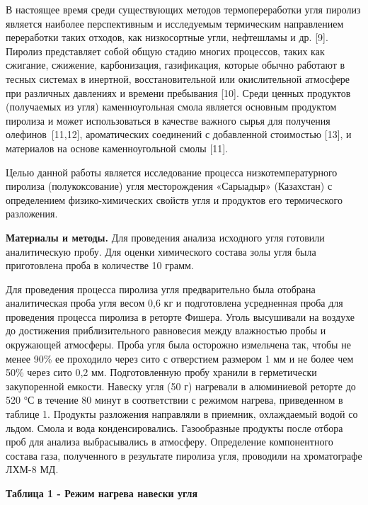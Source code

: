 В настоящее время среди существующих методов термопереработки угля
пиролиз является наиболее перспективным и исследуемым термическим
направлением переработки таких отходов, как низкосортные угли,
нефтешламы и др. {[}9{]}. Пиролиз представляет собой общую стадию многих
процессов, таких как сжигание, сжижение, карбонизация, газификация,
которые обычно работают в тесных системах в инертной, восстановительной
или окислительной атмосфере при различных давлениях и времени пребывания
{[}10{]}. Среди ценных продуктов (получаемых из угля) каменноугольная
смола является основным продуктом пиролиза и может использоваться в
качестве важного сырья для получения олефинов~{[}11,12{]}, ароматических
соединений с добавленной стоимостью {[}13{]}, и материалов на основе
каменноугольной смолы {[}11{]}.~

Целью данной работы является исследование процесса низкотемпературного
пиролиза (полукоксование) угля месторождения «Сарыадыр» (Казахстан) с
определением физико-химических свойств угля и продуктов его термического
разложения.

{\bfseries Материалы и методы.} Для проведения анализа исходного угля
готовили аналитическую пробу. Для оценки химического состава золы угля
была приготовлена проба в количестве 10 грамм.

Для проведения процесса пиролиза угля предварительно была отобрана
аналитическая проба угля весом 0,6 кг и подготовлена усредненная проба
для проведения процесса пиролиза в реторте Фишера. Уголь высушивали на
воздухе до достижения приблизительного равновесия между влажностью пробы
и окружающей атмосферы. Проба угля была осторожно измельчена так, чтобы
не менее 90\% ее проходило через сито с отверстием размером 1 мм и не
более чем 50\% через сито 0,2 мм. Подготовленную пробу хранили в
герметически закупоренной емкости. Навеску угля (50 г) нагревали в
алюминиевой реторте до 520 °С в течение 80 минут в соответствии с
режимом нагрева, приведенном в таблице 1. Продукты разложения направляли
в приемник, охлаждаемый водой со льдом. Смола и вода конденсировались.
Газообразные продукты после отбора проб для анализа выбрасывались в
атмосферу. Определение компонентного состава газа, полученного в
результате пиролиза угля, проводили на хроматографе ЛХМ-8 МД.

{\bfseries Таблица 1 - Режим нагрева навески угля}

